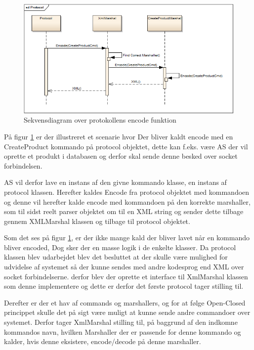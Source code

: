 \begin{figure}[H]
    \centering
    \includegraphics[width=1.0\textwidth]{Systemdesign/SharedLib/Images/Protokol/Protocol_Sek.png}
    \caption{Sekvensdiagram over protokollens encode funktion}
    \label{fig:protocolSek}
\end{figure}

På figur \ref{fig:protocolSek} er der illustreret et scenarie hvor Der bliver kaldt encode med en CreateProduct kommando på protocol objektet, dette kan f.eks. være \gls{AS} der vil oprette et produkt i databasen og derfor skal sende denne besked over socket forbindelsen.

\gls{AS} vil derfor lave en instans af den givne kommando klasse, en instans af protocol klassen. Herefter kaldes Encode fra protocol objektet med kommandoen og denne vil herefter kalde encode med kommandoen på den korrekte marshaller, som til sidst reelt parser objektet om til en XML string og sender dette tilbage gennem XMLMarshal klassen og tilbage til protocol objektet. 

Som det ses på figur \ref{fig:protocolSek}, er der ikke mange kald der bliver lavet når en kommando bliver encoded, Dog sker der en masse logik i de enkelte klasser. Da protocol klassen blev udarbejdet blev det besluttet at der skulle være mulighed for udvidelse af systemet så der kunne sendes med andre kodesprog end XML over socket forbindelserne. derfor blev der oprette et interface til XmlMarshal klassen som denne implementere og dette er derfor det første protocol tager stilling til.

Derefter er der et hav af commands og marshallers, og for at følge Open-Closed princippet skulle det på sigt være muligt at kunne sende andre commandoer over systemet. Derfor tager XmlMarshal stilling til, på baggrund af den indkomne kommandos navn, hvilken Marshaller der er passende for denne kommando og kalder, hvis denne eksistere, encode/decode på denne marshaller.